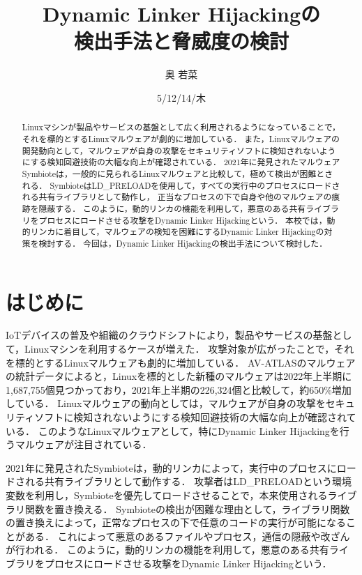 \documentclass[submit,techreq,noauthor]{eco}	%
\begin{document}
\date   {5/12/14/木}				%
\title  {Dynamic Linker Hijackingの\\検出手法と脅威度の検討}	%
\author {奥 若菜}				%


\begin{abstract}
	Linuxマシンが製品やサービスの基盤として広く利用されるようになっていることで，それを標的とするLinuxマルウェアが劇的に増加している．
  また，Linuxマルウェアの開発動向として，マルウェアが自身の攻撃をセキュリティソフトに検知されないようにする検知回避技術の大幅な向上が確認されている．
  2021年に発見されたマルウェアSymbioteは，一般的に見られるLinuxマルウェアと比較して，極めて検出が困難とされる．
  SymbioteはLD\_PRELOADを使用して，すべての実行中のプロセスにロードされる共有ライブラリとして動作し，
  正当なプロセスの下で自身や他のマルウェアの痕跡を隠蔽する．
  このように，動的リンカの機能を利用して，悪意のある共有ライブラリをプロセスにロードさせる攻撃をDynamic Linker Hijackingという．
  本校では，動的リンカに着目して，マルウェアの検知を困難にするDynamic Linker Hijackingの対策を検討する．
  今回は，Dynamic Linker Hijackingの検出手法について検討した．
\end{abstract}
\maketitle


\section{はじめに}
  IoTデバイスの普及や組織のクラウドシフトにより，製品やサービスの基盤として，Linuxマシンを利用するケースが増えた．
  攻撃対象が広がったことで，それを標的とするLinuxマルウェアも劇的に増加している．
  AV-ATLASのマルウェアの統計データによると，Linuxを標的とした新種のマルウェアは2022年上半期に1,687,755個見つかっており，2021年上半期の226,324個と比較して，約650\%増加している\cite{AV-TEST}．
  Linuxマルウェアの動向としては，マルウェアが自身の攻撃をセキュリティソフトに検知されないようにする検知回避技術の大幅な向上が確認されている\cite{IBM}．
  このようなLinuxマルウェアとして，特にDynamic Linker Hijackingを行うマルウェアが注目されている．

  2021年に発見されたSymbiote\cite{Symbiote}は，動的リンカによって，実行中のプロセスにロードされる共有ライブラリとして動作する．
  攻撃者はLD\_PRELOADという環境変数を利用し，Symbioteを優先してロードさせることで，本来使用されるライブラリ関数を置き換える．
  Symbioteの検出が困難な理由として，ライブラリ関数の置き換えによって，正常なプロセスの下で任意のコードの実行が可能になることがある．
  これによって悪意のあるファイルやプロセス，通信の隠蔽や改ざんが行われる．
  このように，動的リンカの機能を利用して，悪意のある共有ライブラリをプロセスにロードさせる攻撃をDynamic Linker Hijackingという．
\end{document}
